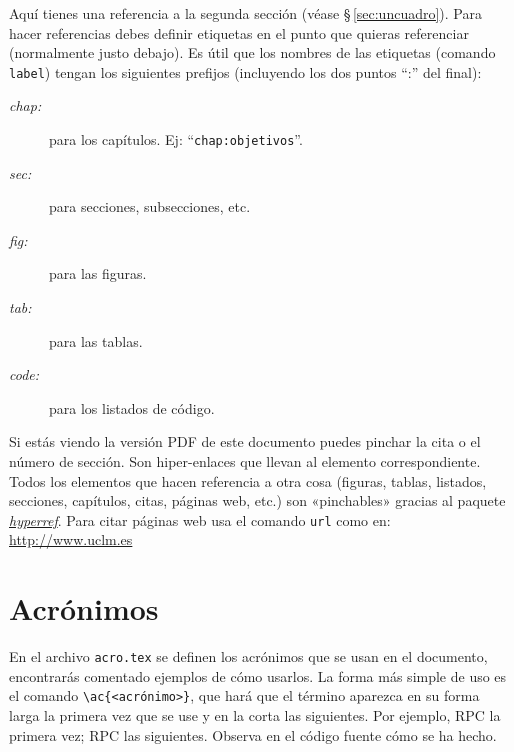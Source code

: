 Aquí tienes una referencia a la segunda sección (véase \S\,\ref{sec:uncuadro}). Para hacer referencias debes definir etiquetas en el punto que quieras referenciar (normalmente justo debajo). Es útil que los nombres de las etiquetas (comando \texttt{label}) tengan los siguientes prefijos (incluyendo los dos puntos ``:'' del final):

\begin{description}
  \item[\emph{chap:}] para los capítulos. Ej: ``\texttt{chap:objetivos}''.
  \item[\emph{sec:}] para secciones, subsecciones, etc.
  \item[\emph{fig:}] para las figuras.
  \item[\emph{tab:}] para las tablas.
  \item[\emph{code:}] para los listados de código.
\end{description}

Si estás viendo la versión PDF de este documento puedes pinchar la cita o el número de sección. Son hiper-enlaces que llevan al elemento correspondiente. Todos los elementos que hacen referencia a otra cosa (figuras, tablas, listados, secciones, capítulos, citas, páginas web, etc.) son «pinchables» gracias al paquete \href{http://latex.tugraz.at/_media/docs/hyperref.pdf}{\emph{hyperref}}. Para citar páginas web usa el comando \texttt{url} como en: \url{http://www.uclm.es}

\section{Acrónimos}
En el archivo \texttt{acro.tex} se definen los acrónimos que se usan en el documento, encontrarás comentado ejemplos de cómo usarlos. La forma más simple de uso es el comando \texttt{\textbackslash ac\{<acrónimo>\}}, que hará que el término aparezca en su forma larga la primera vez que se use y en la corta las siguientes. Por ejemplo, \ac{RPC} la primera vez; \ac{RPC} las siguientes. Observa en el código fuente cómo se ha hecho.



